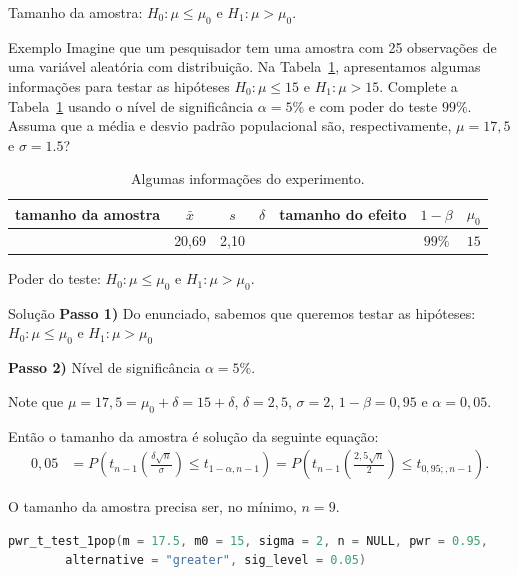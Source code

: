 \documentclass[8pt]{beamer}
\begin{document}
\begin{frame}{Tamanho da amostra: $H_0:\mu \leq \mu_0$ e $H_1: \mu > \mu_0$.}

\normalsize

\begin{block}{Exemplo}
		Imagine que um pesquisador tem uma amostra com 25 observações de uma variável aleatória com distribuição. Na Tabela~\ref{tab:normal-s2-unknown-unilateral-h0-upper-power}, apresentamos algumas informações para testar as hipóteses $H_0: \mu \leq 15$ e $H_1: \mu > 15$. Complete a Tabela~\ref{tab:normal-s2-unknown-unilateral-h0-upper-power} usando o nível de significância $\alpha=5\%$ e com poder do teste $99\%$. Assuma que a média e desvio padrão populacional são, respectivamente, $\mu=17,5$ e $\sigma=1.5$?
	\begin{table}[ht]
		\centering
		\begin{tabular}{c|c|c|c|c|c|c}
			\toprule[0.05cm]
			tamanho da amostra & $\bar{x}$ & $s$  &  $\delta$ & tamanho do efeito & $1-\beta$ & $\mu_0$ \\ 
			\midrule
			 & 20,69 & 2,10 &  &  & $99\%$ & $15$ \\ 
			\bottomrule[0.05cm]
		\end{tabular}
		\caption{Algumas informações do experimento.} 
		\label{tab:normal-s2-unknown-unilateral-h0-upper-power}
	\end{table}	
\end{block}

\normalsize

\end{frame}

\begin{frame}[fragile]{Poder do teste: $H_0:\mu \leq \mu_0$ e $H_1: \mu > \mu_0$.}

\large

\begin{block}{Solução}
	\textbf{Passo 1)} Do enunciado, sabemos que queremos testar as hipóteses: $H_0: \mu \leq \mu_0$ e $H_1: \mu > \mu_0$

	\textbf{Passo 2)} Nível de significância $\alpha = 5\%$.

	Note que $\mu=17,5=\mu_0 + \delta = 15 + \delta$, $\delta = 2,5$, $\sigma = 2$, $1-\beta=0,95$ e $\alpha=0,05$.
	
	Então o tamanho da amostra é solução da seguinte equação:
	\begin{align*}
	0,05 &= P \left( t_{n-1}\left( \frac{\delta\sqrt{n}}{\sigma}\right) \leq t_{1-\alpha, n-1}  \right) = P \left( t_{n-1}\left( \frac{2,5\sqrt{n}}{2}\right) \leq t_{0,95;, n-1} \right).
	\end{align*}
\end{block}
O tamanho da amostra precisa ser, no mínimo, $n=9$.

\begin{lstlisting}[language = C, caption = Código no R.]
pwr_t_test_1pop(m = 17.5, m0 = 15, sigma = 2, n = NULL, pwr = 0.95,
		alternative = "greater", sig_level = 0.05)
\end{lstlisting}

\normalsize
\end{frame}
\end{document}
